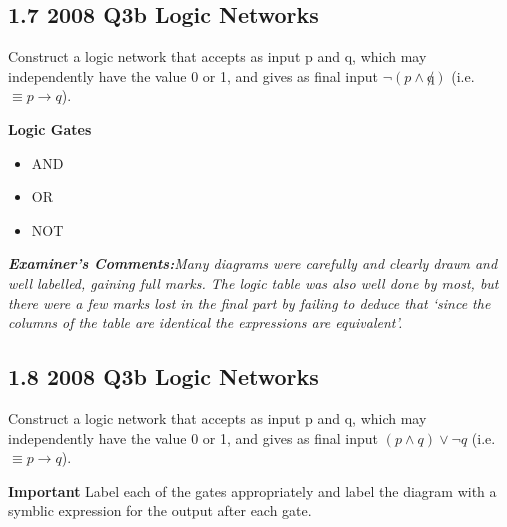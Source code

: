 \subsection*{1.7 2008 Q3b Logic Networks }

Construct a logic network that accepts as input p and q, which may independently have the value 0 or 1, and
gives as final input $\neg(p \wedge \not q)$ (i.e. $\equiv p \rightarrow q$).\\
\bigskip

\textbf{Logic Gates}
\begin{itemize}
\item AND
\item OR
\item NOT
\end{itemize}
\bigskip

\emph{\textbf{Examiner's Comments:}Many
diagrams were carefully and clearly drawn and well labelled, gaining full
marks. The logic table was also well done by most, but there were a few marks
lost in the final part by failing to deduce that ‘since the columns of the table are
identical the expressions are equivalent’.}

\subsection*{1.8 2008 Q3b Logic Networks }
Construct a logic network that accepts as input p and q, which may independently have the value 0 or 1, and
gives as final input $(p \wedge  q) \vee \neg q$ (i.e. $\equiv p \rightarrow q$).



\textbf{Important} Label each of the gates appropriately and label the diagram with a symblic expression for the output after each gate.

